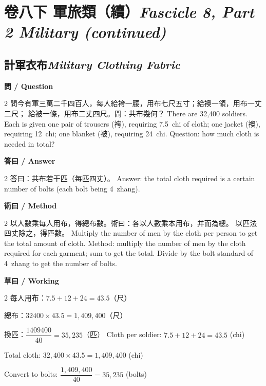 \documentclass[11pt,a4paper]{article}
\newcommand{\bilingualsection}[2]{\section{#1\hfill\textit{\small #2}}}
\newcommand{\bilingualsubsection}[2]{\subsection{#1\quad\textit{#2}}}
\begin{document}
\newpage

\bilingualsection{卷八下 \quad 軍旅類（續）}{Fascicle 8, Part 2 \quad Military (continued)}
\label{sec:fasc8b}

\bilingualsubsection{計軍衣布}{Military Clothing Fabric}

\vspace{0.4em}
\noindent\textbf{\textcolor{chinesecolor}{問} / \textcolor{englishcolor}{Question}}
\vspace{0.3em}
\begin{paracol}{2}
問今有軍三萬二千四百人，每人給袴一腰，用布七尺五寸；給襖一領，用布一丈二尺；
給被一條，用布二丈四尺。問：共布幾何？
\switchcolumn
There are 32{,}400 soldiers. Each is given one pair of trousers (袴),
requiring 7.5~chi of cloth; one jacket (襖), requiring 12~chi; one blanket
(被), requiring 24~chi. Question: how much cloth is needed in total?
\end{paracol}

\vspace{0.4em}
\noindent\textbf{\textcolor{chinesecolor}{答曰} / \textcolor{englishcolor}{Answer}}
\vspace{0.2em}
\begin{paracol}{2}
答曰：共布若干匹（每匹四丈）。
\switchcolumn
Answer: the total cloth required is a certain number of bolts (each bolt
being 4~zhang).
\end{paracol}

\vspace{0.4em}
\noindent\textbf{\textcolor{chinesecolor}{術曰} / \textcolor{englishcolor}{Method}}
\vspace{0.2em}
\begin{paracol}{2}
以人數乘每人用布，得總布數。術曰：各以人數乘本用布，并而為總。
以匹法四丈除之，得匹數。
\switchcolumn
Multiply the number of men by the cloth per person to get the total amount
of cloth. Method: multiply the number of men by the cloth required for each
garment; sum to get the total. Divide by the bolt standard of 4~zhang to get
the number of bolts.
\end{paracol}

\vspace{0.4em}
\noindent\textbf{\textcolor{chinesecolor}{草曰} / \textcolor{englishcolor}{Working}}
\vspace{0.2em}
\begin{paracol}{2}
每人用布：$7.5 + 12 + 24 = 43.5$（尺）

總布：$32400 \times 43.5 = 1{,}409{,}400$（尺）

換匹：$\dfrac{1409400}{40} = 35{,}235$（匹）
\switchcolumn
Cloth per soldier: $7.5 + 12 + 24 = 43.5$ (chi)

Total cloth: $32{,}400 \times 43.5 = 1{,}409{,}400$ (chi)

Convert to bolts: $\dfrac{1{,}409{,}400}{40} = 35{,}235$ (bolts)
\end{paracol}
\end{document}
